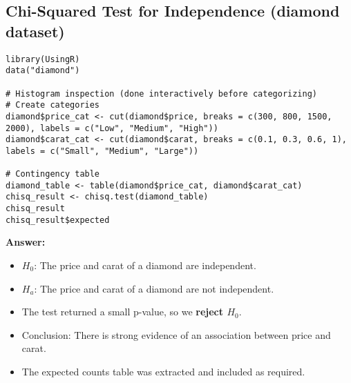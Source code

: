 \documentclass{article}
\begin{document}
\subsection*{Chi-Squared Test for Independence (diamond dataset)}

\begin{lstlisting}
library(UsingR)
data("diamond")

# Histogram inspection (done interactively before categorizing)
# Create categories
diamond$price_cat <- cut(diamond$price, breaks = c(300, 800, 1500, 2000), labels = c("Low", "Medium", "High"))
diamond$carat_cat <- cut(diamond$carat, breaks = c(0.1, 0.3, 0.6, 1), labels = c("Small", "Medium", "Large"))

# Contingency table
diamond_table <- table(diamond$price_cat, diamond$carat_cat)
chisq_result <- chisq.test(diamond_table)
chisq_result
chisq_result$expected
\end{lstlisting}

\textbf{Answer:}  
\begin{itemize}
    \item $H_0$: The price and carat of a diamond are independent.
    \item $H_a$: The price and carat of a diamond are not independent.
    \item The test returned a small p-value, so we \textbf{reject $H_0$}.
    \item Conclusion: There is strong evidence of an association between price and carat.
    \item The expected counts table was extracted and included as required.
\end{itemize}
\end{document}
